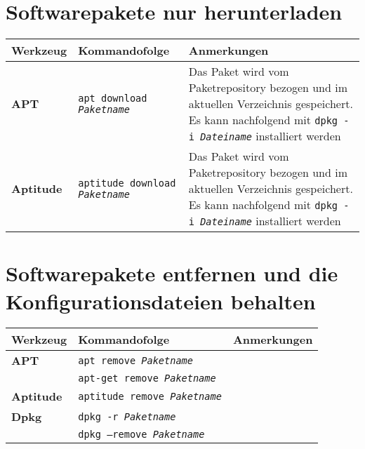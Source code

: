 \documentclass[10pt,a4paper]{article}
\begin{document}
\section{Softwarepakete nur herunterladen}
\begin{tabular}{ p{3.5cm} p{9.6cm} p{11cm}}
  \hline
  \rowcolor{Gray}
  \textbf{Werkzeug} & \textbf{Kommandofolge} & \textbf{Anmerkungen} \\
  \hline 
  \textbf{APT} & \texttt{apt download \textit{Paketname}} & Das Paket wird vom Paketrepository bezogen und im aktuellen \newline Verzeichnis gespeichert. Es kann nachfolgend mit \texttt{dpkg -i \textit{Dateiname}} installiert werden\\
  \rowcolor{Gray}
  \textbf{Aptitude} & \texttt{aptitude download \textit{Paketname}} & Das Paket wird vom Paketrepository bezogen und im aktuellen \newline Verzeichnis gespeichert. Es kann nachfolgend mit \texttt{dpkg -i \textit{Dateiname}} installiert werden \\
  \hline
\end{tabular}

\section{Softwarepakete entfernen und die Konfigurationsdateien behalten}
\begin{tabular}{ p{3.5cm} p{9.6cm} p{11cm}}
  \hline
  \rowcolor{Gray}
  \textbf{Werkzeug} & \textbf{Kommandofolge} & \textbf{Anmerkungen} \\
  \hline 
  \textbf{APT} & \texttt{apt remove \textit{Paketname}} & \\
  \rowcolor{Gray}
  & \texttt{apt-get remove \textit{Paketname}} & \\
  \textbf{Aptitude} & \texttt{aptitude remove \textit{Paketname}} & \\
  \rowcolor{Gray}
  \textbf{Dpkg} & \texttt{dpkg -r \textit{Paketname}} & \\
  & \texttt{dpkg --remove \textit{Paketname}} & \\
  \hline
\end{tabular}

\newpage

\cheatsheet
\end{document}
